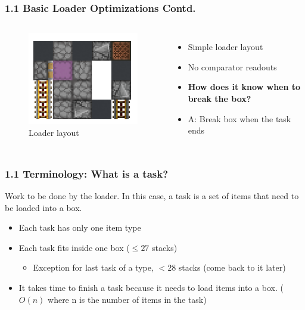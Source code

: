 \documentclass[aspectratio=169]{beamer}
\begin{document}
\begin{frame}
	\frametitle{1.1 Basic Loader Optimizations Contd.}
    \begin{columns}

	\begin{figure}
		\includegraphics[width=1\textwidth]{toploaderview.png}
		\caption{Loader layout}
	\end{figure}

    \begin{itemize}
        \item Simple loader layout
		\item No comparator readouts
		\item \textbf{How does it know when to break the box?}
		\item A: Break box when the task ends
	\end{itemize}
    \end{columns}
	
\end{frame}


\begin{frame}
	\frametitle{1.1 Terminology: What is a task?}
    
    Work to be done by the loader. In this case, a task is a set of items that need to be loaded into a box.
    \begin{itemize}
        \item Each task has only one item type
        \item Each task fits inside one box ($\leq 27$ stacks)
        \begin{itemize}
            \item Exception for last task of a type, $< 28$ stacks (come back to it later)
        \end{itemize}
        \item It takes time to finish a task because it needs to load items into a box. ($O(n)$ where n is the number of items in the task)
    \end{itemize}
	
\end{frame}
\end{document}

